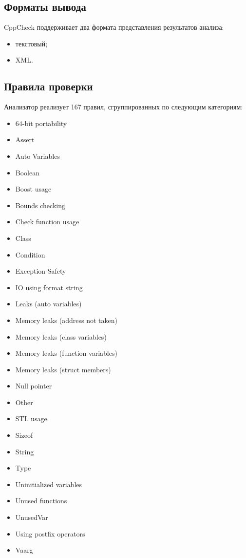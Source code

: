 \documentclass{article}[14pt]
\begin{document}
\subsection*{Форматы вывода}

CppCheck поддерживает два формата представления результатов анализа:
\begin{itemize}
\item текстовый;
\item XML.
\end{itemize}

\subsection*{Правила проверки}

Анализатор реализует 167 правил, сгруппированных по следующим категориям:

\begin{itemize}
\item 64-bit portability
\item Assert
\item Auto Variables
\item Boolean
\item Boost usage
\item Bounds checking
\item Check function usage
\item Class
\item Condition
\item Exception Safety
\item IO using format string
\item Leaks (auto variables)
\item Memory leaks (address not taken)
\item Memory leaks (class variables)
\item Memory leaks (function variables)
\item Memory leaks (struct members)
\item Null pointer
\item Other
\item STL usage
\item Sizeof
\item String
\item Type
\item Uninitialized variables
\item Unused functions
\item UnusedVar
\item Using postfix operators
\item Vaarg
\end{itemize}
\end{document}
